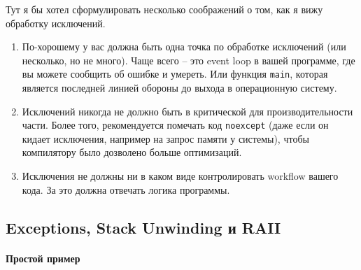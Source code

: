 Тут я бы хотел сформулировать несколько соображений о том, как я вижу обработку исключений.
\begin{enumerate}
\item По-хорошему у вас должна быть одна точка по обработке исключений (или несколько, но не много).
Чаще всего -- это event loop в вашей программе, где вы можете сообщить об ошибке и умереть.
Или функция \verb"main", которая является последней линией обороны до выхода в операционную систему.

\item Исключений никогда не должно быть в критической для производительности части.
Более того, рекомендуется помечать код \verb"noexcept" (даже если он кидает исключения, например на запрос памяти у системы), чтобы компилятору было дозволено больше оптимизаций.

\item Исключения не должны ни в каком виде контролировать workflow вашего кода.
За это должна отвечать логика программы.
\end{enumerate}

\subsection{Exceptions, Stack Unwinding и RAII}

\paragraph{Простой пример}


